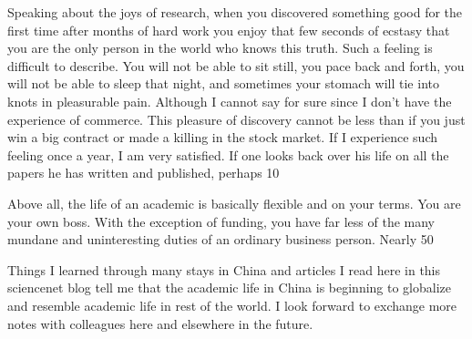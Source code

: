 \documentclass{article}
\begin{document}
Speaking about the joys of research, when you discovered something good for the first time after months of hard work you enjoy that few seconds of ecstasy that you are the only person in the world who knows this truth. Such a feeling is difficult to describe. You will not be able to sit still, you pace back and forth, you will not be able to sleep that night, and sometimes your stomach will tie into knots in pleasurable pain. Although I cannot say for sure since I don’t have the experience of commerce. This pleasure of discovery cannot be less than if you just win a big contract or made a killing in the stock market. If I experience such feeling once a year, I am very satisfied. If one looks back over his life on all the papers he has written and published, perhaps 10%



Above all, the life of an academic is basically flexible and on your terms. You are your own boss. With the exception of funding, you have far less of the many mundane and uninteresting duties of an ordinary business person. Nearly 50%



Things I learned through many stays in China and articles I read here in this sciencenet blog tell me that the academic life in China is beginning to globalize and resemble academic life in rest of the world. I look forward to exchange more notes with colleagues here and elsewhere  in the future.
\end{document}
